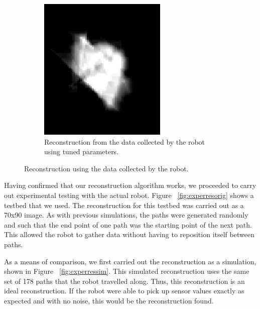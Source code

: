 \documentclass[english]{article}\usepackage[]{graphicx}\usepackage[]{color}
\begin{document}
\begin{figure}[h]
\begin{subfigure}{.22\textwidth}
    \includegraphics[width=1\linewidth]{figures/experimentalresulttunedrec}
  \caption{Reconstruction from the data collected by the robot using tuned parameters.}
  \vspace{0pt}
  \label{fig:experrestuned}
\end{subfigure}
\caption{Reconstruction using the data collected by the robot.}
\label{fig:experres}
\end{figure}

Having confirmed that our reconstruction algorithm works, we proceeded to carry out experimental testing with the actual robot. Figure ~\ref{fig:experresorig} shows a testbed that we used. The reconstruction for this testbed was carried out as a 70x90 image. As with previous simulations, the paths were generated randomly and such that the end point of one path was the starting point of the next path. This allowed the robot to gather data without having to reposition itself between paths.

As a means of comparison, we first carried out the reconstruction as a simulation, shown in Figure ~\ref{fig:experressim}. This simulated reconstruction uses the same set of 178 paths that the robot travelled along. Thus, this reconstruction is an ideal reconstruction. If the robot were able to pick up sensor values exactly as expected and with no noise, this would be the reconstruction found.
\end{document}
